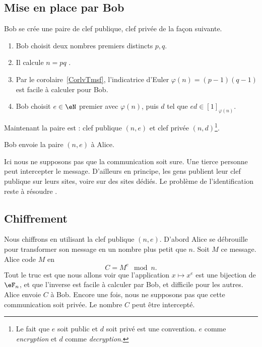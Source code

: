 \subsection{Mise en place par Bob}

Bob se crée une paire de clef publique, clef privée de la façon suivante.
\begin{enumerate}
	\item
	      Bob choisit deux nombres premiers distincts \( p,q\).
	\item
	      Il calcule \( n=pq\) .
	\item
	      Par le corolaire~\ref{CorlvTmsf}, l'indicatrice d'Euler \( \varphi(n)=(p-1)(q-1)\) est facile à calculer pour Bob.
	\item
	      Bob choisit \( e\in \eN\) premier avec \( \varphi(n)\), puis \( d\) tel que \( ed\in[1]_{\varphi(n)}\).
\end{enumerate}
Maintenant la paire est : clef publique \( (n,e)\) et clef privée \( (n,d)\)\footnote{Le fait que \( e\) soit public et \( d\) soit privé est une convention. \( e\) comme  \emph{encryption} et \( d\) comme \emph{decryption}.}.

Bob envoie la paire \( (n,e)\) à Alice.

\begin{remark}
	Ici nous ne supposons pas que la communication soit sure. Une tierce personne peut intercepter le message. D'ailleurs en principe, les gens publient leur clef publique sur leurs sites, voire sur des sites dédiés. Le problème de l'identification reste à résoudre .
\end{remark}

\subsection{Chiffrement}

Nous chiffrons en utilisant la clef publique \( (n,e)\). D'abord Alice se débrouille pour transformer son message en un nombre plus petit que \( n\). Soit \( M\) ce message. Alice code \( M\) en
\begin{equation}
	C=M^e\mod n.
\end{equation}
Tout le truc est que nous allons voir que l'application \( x\mapsto x^e\) est une bijection de \( \eF_n\), et que l'inverse est facile à calculer par Bob, et difficile pour les autres. Alice envoie \( C\) à Bob. Encore une fois, nous ne supposons pas que cette communication soit privée. Le nombre \( C\) peut être intercepté.

